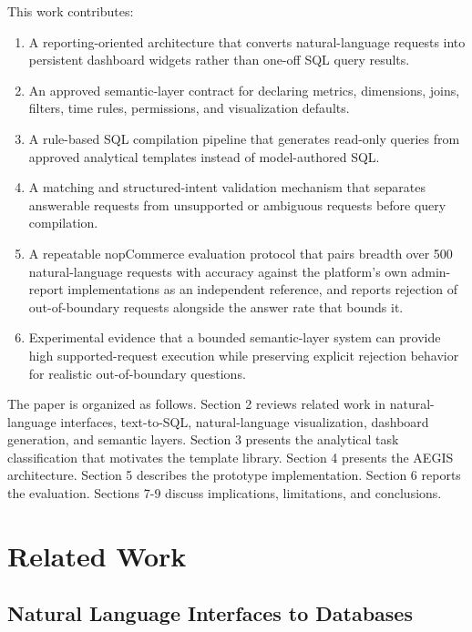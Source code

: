 \documentclass[pdflatex,sn-mathphys-num]{sn-jnl}
\begin{document}
This work contributes:


\begin{enumerate}
\item A reporting-oriented architecture that converts natural-language requests into persistent dashboard widgets rather than one-off SQL query results.
\item An approved semantic-layer contract for declaring metrics, dimensions, joins, filters, time rules, permissions, and visualization defaults.
\item A rule-based SQL compilation pipeline that generates read-only queries from approved analytical templates instead of model-authored SQL.
\item A matching and structured-intent validation mechanism that separates answerable requests from unsupported or ambiguous requests before query compilation.
\item A repeatable nopCommerce evaluation protocol that pairs breadth over 500 natural-language requests with accuracy against the platform's own admin-report implementations as an independent reference, and reports rejection of out-of-boundary requests alongside the answer rate that bounds it.
\item Experimental evidence that a bounded semantic-layer system can provide high supported-request execution while preserving explicit rejection behavior for realistic out-of-boundary questions.
\end{enumerate}

The paper is organized as follows. Section 2 reviews related work in natural-language interfaces, text-to-SQL, natural-language visualization, dashboard generation, and semantic layers. Section 3 presents the analytical task classification that motivates the template library. Section 4 presents the AEGIS architecture. Section 5 describes the prototype implementation. Section 6 reports the evaluation. Sections 7-9 discuss implications, limitations, and conclusions.


\section{Related Work}

\subsection{Natural Language Interfaces to Databases}
\end{document}
